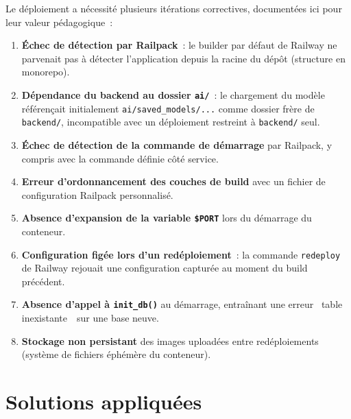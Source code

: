 Le d\'eploiement a n\'ecessit\'e plusieurs it\'erations correctives, document\'ees ici pour leur valeur p\'edagogique~:

\begin{enumerate}
  \item \textbf{\'Echec de d\'etection par Railpack}~: le builder par d\'efaut de Railway ne parvenait pas \`a d\'etecter l'application depuis la racine du d\'ep\^ot (structure en monorepo).
  \item \textbf{D\'ependance du backend au dossier \texttt{ai/}}~: le chargement du mod\`ele r\'ef\'eren\c{c}ait initialement \texttt{ai/saved\_models/...} comme dossier fr\`ere de \texttt{backend/}, incompatible avec un d\'eploiement restreint \`a \texttt{backend/} seul.
  \item \textbf{\'Echec de d\'etection de la commande de d\'emarrage} par Railpack, y compris avec la commande d\'efinie c\^ot\'e service.
  \item \textbf{Erreur d'ordonnancement des couches de build} avec un fichier de configuration Railpack personnalis\'e.
  \item \textbf{Absence d'expansion de la variable \texttt{\$PORT}} lors du d\'emarrage du conteneur.
  \item \textbf{Configuration fig\'ee lors d'un red\'eploiement}~: la commande \texttt{redeploy} de Railway rejouait une configuration captur\'ee au moment du build pr\'ec\'edent.
  \item \textbf{Absence d'appel \`a \texttt{init\_db()}} au d\'emarrage, entra\^inant une erreur \guillemotleft~table inexistante~\guillemotright\ sur une base neuve.
  \item \textbf{Stockage non persistant} des images upload\'ees entre red\'eploiements (syst\`eme de fichiers \'eph\'em\`ere du conteneur).
\end{enumerate}

\section{Solutions appliqu\'ees}

